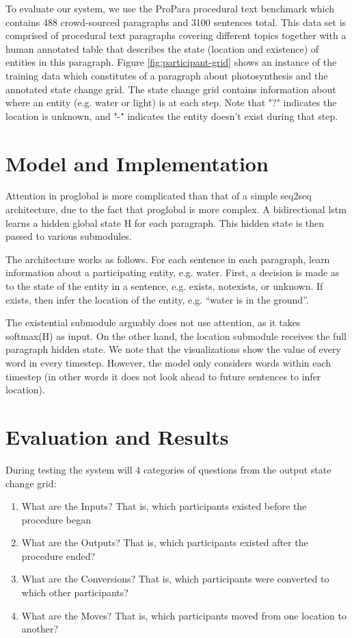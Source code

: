 \documentclass[11pt,a4paper]{article}
\begin{document}
To evaluate our system, we use the ProPara procedural text benchmark 
which contains 488 crowd-sourced paragraphs and 3100 sentences total. 
This data set is comprised of procedural text paragraphs covering different 
topics together with a human annotated table that describes the state 
(location and existence) of entities in this paragraph. Figure 
\ref{fig:participant-grid} shows an instance of the training data which 
constitutes of a paragraph about photosynthesis and the annotated state 
change grid. The state change grid contains information about where an 
entity (e.g. water or light) is at each step. Note that "?" indicates the 
location is unknown, and "-" indicates the entity doesn't exist during that step.

\section{Model and Implementation}

Attention in proglobal is more complicated than that of a simple seq2seq architecture, due to the fact that proglobal is more complex. A bidirectional lstm learns a hidden global state H for each paragraph. This hidden state is then passed to various submodules.

The architecture works as follows. For each sentence in each paragraph, learn information about a participating entity, e.g. water. First, a decision is made as to the state of the entity in a sentence, e.g. exists, notexists, or unknown. If exists, then infer the location of the entity, e.g. “water is in the ground”.

The existential submodule arguably does not use attention, as it takes softmax(H) as input. On the other hand, the location submodule receives the full paragraph hidden state. We note that the visualizations show the value of every word in every timestep. However, the model only considers words within each timestep (in other words it does not look ahead to future sentences to infer location).


\section{Evaluation and Results}

During testing the system will 4 categories of questions from the output 
state change grid: 

\begin{enumerate}
  \item What are the Inputs? That is, which participants existed before the 
  	  procedure began
  \item What are the Outputs? That is, which participants existed after 
	  the procedure ended?
  \item What are the Conversions? That is, which participants were 
  	  converted to which other participants?
  \item What are the Moves? That is, which participants 
	   moved from one location to another?
\end{enumerate}
\end{document}
